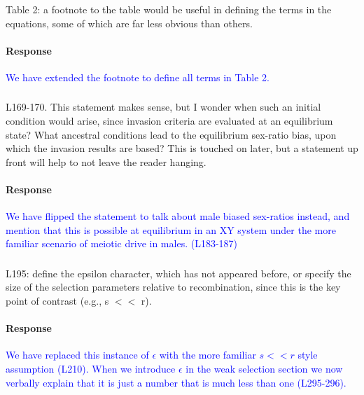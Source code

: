 \documentclass[10pt,letterpaper]{article}
\begin{document}
\noindent\subsubsection{}
Table 2: a footnote to the table would be useful in defining the terms in the equations, some of which are far less obvious than others.

\noindent\paragraph{Response}
\textcolor{blue}{We have extended the footnote to define all terms in Table 2.}

\noindent\subsubsection{}
L169-170. This statement makes sense, but I wonder when such an initial condition would arise, since invasion criteria are evaluated at an equilibrium state? What ancestral conditions lead to the equilibrium sex-ratio bias, upon which the invasion results are based? This is touched on later, but a statement up front will help to not leave the reader hanging.

\noindent\paragraph{Response}
\textcolor{blue}{We have flipped the statement to talk about male biased sex-ratios instead, and mention that this is possible at equilibrium in an XY system under the more familiar scenario of meiotic drive in males. (L183-187)}

\noindent\subsubsection{}
L195: define the epsilon character, which has not appeared before, or specify the size of the selection parameters relative to recombination, since this is the key point of contrast (e.g., s $<<$ r).

\noindent\paragraph{Response}
\textcolor{blue}{We have replaced this instance of $\epsilon$ with the more familiar $s<<r$ style assumption (L210). When we introduce $\epsilon$ in the weak selection section we now verbally explain that it is just a number that is much less than one (L295-296).}
\end{document}
